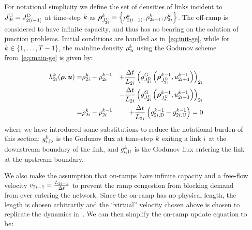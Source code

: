 			For notational simplicity we define the set of densities of links
			incident to $J_{2i}^{\text{U}}=J_{2\left(i-1\right)}^{\text{D}}$ at time-step
			$k$ as $\juncstate{\jup{2\link}}{\tind}=\left\{ \discrete{2\left(\link-1\right)}{\tind},\discrete{2i-1}{\tind},\discrete{2\link}{\tind}\right\} $.
			The off-ramp is considered to have infinite capacity, and thus has
			no bearing on the solution of junction problems. Initial conditions
			are handled as in~\eqref{eq:init-ge}, while for $k\in\left\{ 1,\ldots,T-1\right\}$,
			the mainline density $\rho_{2i}^{k}$ using the Godunov
			scheme from~\eqref{eq:main-ge} is given by:
						
			\begin{eqnarray}
				\syseq_{2\link}^{\tind}(\state,\control)= & \discrete{2\link}{\tind}-\discrete{2\link}{\tind-1} & +\dfrac{\Delta t}{\length_{2\link}}\left(\god_{\jdown{2\link}}\left(\juncstate{\jdown{2\link}}{\tind-1},\ramp_{2\link+1}^{\tind-1}\right)\right)_{2\link}\label{eq:rho-update}\\
				&  & -\dfrac{\Delta t}{\length_{2\link}}\left(\god_{\jup{2\link}}\left(\juncstate{\jup{2\link}}{\tind-1},\ramp_{2\link-1}^{\tind-1}\right)\right)_{2\link}\nonumber \\
				= & \discrete{2\link}{\tind}-\discrete{2\link}{\tind-1} & +\frac{\Delta t}{\length_{2\link}}\left(\fout{2\link}{\tind-1}-\fin{2\link}{\tind-1}\right)=0
			\end{eqnarray}
			where we have introduced some substitutions to reduce the notational
			burden of this section: $g_{i,\text{D}}^{k}$ is the Godunov flux
			at time-step $k$ exiting a link $i$ at the downstream boundary
			of the link, and $g_{i,\text{U}}^{k}$ is the Godunov flux entering
			the link at the upstream boundary.
						
			We also make the assumption that on-ramps have infinite capacity and
			a free-flow velocity $v_{2i-1}=\frac{L_{2i-1}}{\Delta t}$
			to prevent the ramp congestion from blocking demand from ever entering
			the network. Since the on-ramp has no physical length, the length
			is chosen arbitrarily and the ``virtual'' velocity chosen above
			is chosen to replicate the dynamics in~\cite{Monache2013}. We can
			then simplify the on-ramp update equation to be:
						
